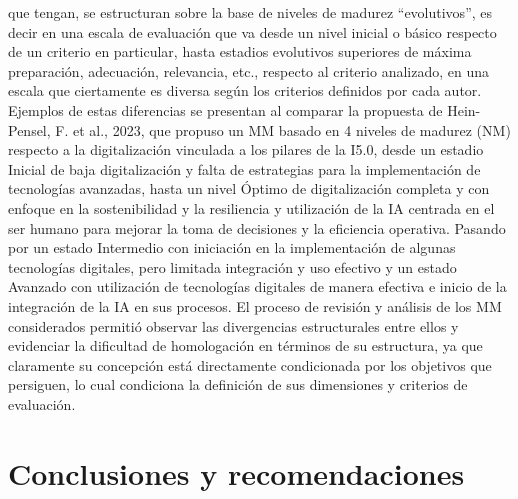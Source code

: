 \documentclass{article}
\begin{document}
que tengan, se estructuran sobre la base de niveles de madurez
``evolutivos'', es decir en una escala de evaluación que va desde un
nivel inicial o básico respecto de un criterio en particular, hasta
estadios evolutivos superiores de máxima preparación, adecuación,
relevancia, etc., respecto al criterio analizado, en una escala que
ciertamente es diversa según los criterios definidos por cada autor.
Ejemplos de estas diferencias se presentan al comparar la propuesta de
Hein-Pensel, F. et al., 2023, que propuso un MM basado en 4 niveles de
madurez (NM) respecto a la digitalización vinculada a los pilares de la
I5.0, desde un estadio Inicial de baja digitalización y falta de
estrategias para la implementación de tecnologías avanzadas, hasta un
nivel Óptimo de digitalización completa y con enfoque en la
sostenibilidad y la resiliencia y utilización de la IA centrada en el
ser humano para mejorar la toma de decisiones y la eficiencia operativa.
Pasando por un estado Intermedio con iniciación en la implementación de
algunas tecnologías digitales, pero limitada integración y uso efectivo
y un estado Avanzado con utilización de tecnologías digitales de manera
efectiva e inicio de la integración de la IA en sus procesos. El proceso
de revisión y análisis de los MM considerados permitió observar las
divergencias estructurales entre ellos y evidenciar la dificultad de
homologación en términos de su estructura, ya que claramente su
concepción está directamente condicionada por los objetivos que
persiguen, lo cual condiciona la definición de sus dimensiones y
criterios de evaluación.

\section{Conclusiones y
recomendaciones}\label{conclusiones-y-recomendaciones}
\end{document}
